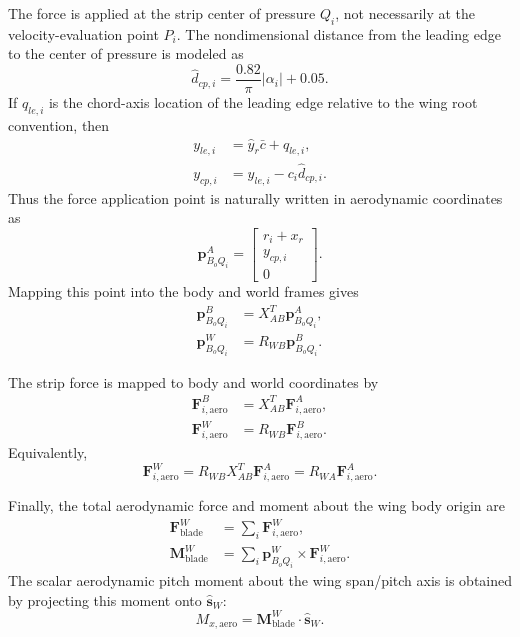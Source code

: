 \documentclass{article}
\begin{document}
The force is applied at the strip center of pressure \(Q_i\), not necessarily at the
velocity-evaluation point \(P_i\). The nondimensional distance from the leading edge
to the center of pressure is modeled as
\begin{equation}
    \hat{d}_{cp,i}
        =
        \frac{0.82}{\pi}|\alpha_i|+0.05.
\end{equation}
If \(q_{le,i}\) is the chord-axis location of the leading edge relative to the wing
root convention, then
\begin{align}
    y_{le,i}
        &= \hat{y}_r\bar{c}+q_{le,i}, \\
    y_{cp,i}
        &= y_{le,i}-c_i\hat{d}_{cp,i}.
\end{align}
Thus the force application point is naturally written in aerodynamic coordinates as
\begin{equation}
    \mathbf{p}_{B_oQ_i}^{A}
    =
    \begin{bmatrix}
        r_i+x_r \\
        y_{cp,i} \\
        0
    \end{bmatrix}.
\end{equation}
Mapping this point into the body and world frames gives
\begin{align}
    \mathbf{p}_{B_oQ_i}^{B}
        &=
        X_{AB}^{T}\mathbf{p}_{B_oQ_i}^{A}, \\
    \mathbf{p}_{B_oQ_i}^{W}
        &=
        R_{WB}\mathbf{p}_{B_oQ_i}^{B}.
\end{align}

The strip force is mapped to body and world coordinates by
\begin{align}
    \mathbf{F}_{i,\mathrm{aero}}^{B}
        &=
        X_{AB}^{T}\mathbf{F}_{i,\mathrm{aero}}^{A}, \\
    \mathbf{F}_{i,\mathrm{aero}}^{W}
        &=
        R_{WB}\mathbf{F}_{i,\mathrm{aero}}^{B}.
\end{align}
Equivalently,
\begin{equation}
    \mathbf{F}_{i,\mathrm{aero}}^{W}
    =
    R_{WB}X_{AB}^{T}\mathbf{F}_{i,\mathrm{aero}}^{A}
    =
    R_{WA}\mathbf{F}_{i,\mathrm{aero}}^{A}.
\end{equation}

Finally, the total aerodynamic force and moment about the wing body origin are
\begin{align}
    \mathbf{F}_{\mathrm{blade}}^{W}
        &=
        \sum_i
        \mathbf{F}_{i,\mathrm{aero}}^{W}, \\
    \mathbf{M}_{\mathrm{blade}}^{W}
        &=
        \sum_i
        \mathbf{p}_{B_oQ_i}^{W}
        \times
        \mathbf{F}_{i,\mathrm{aero}}^{W}.
\end{align}
The scalar aerodynamic pitch moment about the wing span/pitch axis is obtained by
projecting this moment onto \(\hat{\mathbf{s}}_W\):
\begin{equation}
    M_{x,\mathrm{aero}}
    =
    \mathbf{M}_{\mathrm{blade}}^{W}\cdot\hat{\mathbf{s}}_W.
\end{equation}
\end{document}
